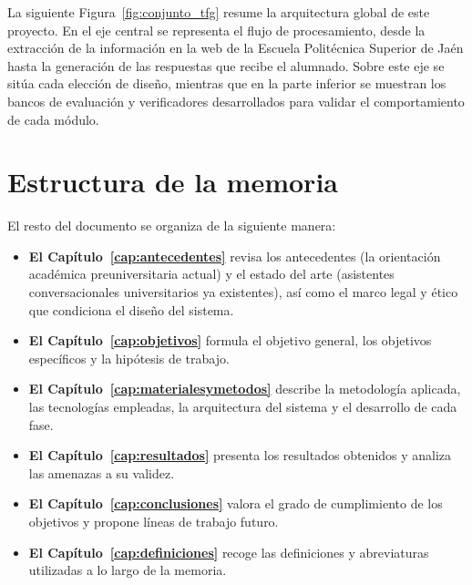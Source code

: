 La siguiente Figura~\ref{fig:conjunto_tfg} resume la arquitectura global de este proyecto. En el eje central se representa el flujo de procesamiento, desde la extracción de la información en la web de la Escuela Politécnica Superior de Jaén hasta la generación de las respuestas que recibe el alumnado. Sobre este eje se sitúa cada elección de diseño, mientras que en la parte inferior se muestran los bancos de evaluación y verificadores desarrollados para validar el comportamiento de cada módulo.



\section{Estructura de la memoria}

El resto del documento se organiza de la siguiente manera:

\begin{itemize}                      
  \item \textbf{El Capítulo~\ref{cap:antecedentes}} revisa los antecedentes (la orientación académica preuniversitaria actual) y el estado del arte (asistentes conversacionales universitarios ya existentes), así como el marco legal y ético que condiciona el diseño del sistema.
  \item \textbf{El Capítulo~\ref{cap:objetivos}} formula el objetivo general, los objetivos específicos y la hipótesis de trabajo.
  \item \textbf{El Capítulo~\ref{cap:materialesymetodos}} describe la metodología aplicada, las tecnologías empleadas, la arquitectura del sistema y el desarrollo de cada fase.
  \item \textbf{El Capítulo~\ref{cap:resultados}} presenta los resultados obtenidos y analiza las amenazas a su validez.
  \item \textbf{El Capítulo~\ref{cap:conclusiones}} valora el grado de cumplimiento de los objetivos y propone líneas de trabajo futuro.
  \item \textbf{El Capítulo~\ref{cap:definiciones}} recoge las definiciones y abreviaturas utilizadas a lo largo de la memoria.
\end{itemize}
